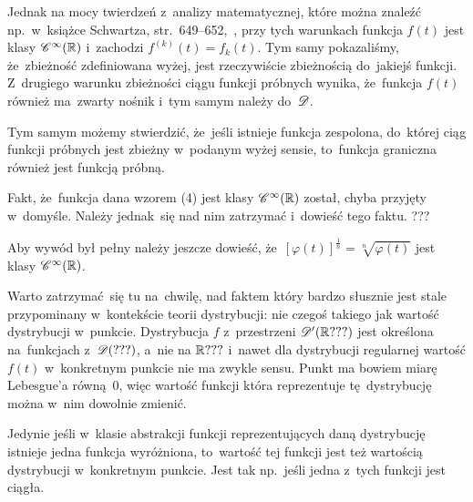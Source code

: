 \documentclass[a4paper,11pt]{article}
\numberwithin{equation}{section}
\begin{document}
Jednak na mocy twierdzeń z~analizy matematycznej, które można znaleźć
np.~w~książce Schwartza, str.~649--652,~\cite{SchwartzKursAnalizyMatematycznejVolI1979}, przy tych
warunkach funkcja $f( t )$ jest klasy $\mathcal{C}^{ \infty }( \mathbb{R} )$ i~zachodzi
$f^{ ( k ) }( t ) = f_{ k }( t )$. Tym samy pokazaliśmy, że~zbieżność
zdefiniowana wyżej, jest rzeczywiście zbieżnością do~jakiejś funkcji.
Z~drugiego warunku zbieżności ciągu funkcji próbnych wynika,
że~funkcja $f( t )$ również ma~zwarty nośnik i~tym samym należy
do~$\mathcal{D}$.

Tym samym możemy stwierdzić, że~jeśli istnieje funkcja zespolona,
do~której ciąg funkcji próbnych jest zbieżny w~podanym wyżej sensie,
to~funkcja graniczna również jest funkcją próbną.

\VerSpaceFour





\noindent
{} Fakt, że~funkcja dana wzorem (4) jest klasy
$\mathcal{C}^{ \infty }( \mathbb{R} )$ został, chyba przyjęty w~domyśle. Należy jednak~się
nad nim zatrzymać i~dowieść tego faktu. ???

\VerSpaceFour





\noindent
{} Aby wywód był pełny należy jeszcze dowieść,
że~$[ \varphi( t ) ]^{ \frac{ 1 }{ n } } = \sqrt[ n ]{ \varphi( t ) }$ jest
klasy $\mathcal{C}^{ \infty }( \mathbb{R} )$.

\VerSpaceFour





\noindent
{} Warto zatrzymać~się tu na~chwilę, nad faktem który
bardzo słusznie jest stale przypominany w~kontekście teorii
dystrybucji: nie czegoś takiego jak wartość dystrybucji w~punkcie.
Dystrybucja $f$ z~przestrzeni $\mathcal{D}'( \mathbb{R} ??? )$ jest określona
na~funkcjach z~$\mathcal{D}( ??? )$, a~nie na $\mathbb{R} ???$ i~nawet dla dystrybucji
regularnej wartość $f( t )$ w~konkretnym punkcie nie ma zwykle sensu.
Punkt ma bowiem miarę Lebesgue’a równą~0, więc wartość funkcji która
reprezentuje tę~dystrybucję można w~nim dowolnie zmienić.

Jedynie jeśli w~klasie abstrakcji funkcji reprezentujących daną
dystrybucję istnieje jedna funkcja wyróżniona, to~wartość tej funkcji
jest też wartością dystrybucji w~konkretnym punkcie. Jest tak
np.~jeśli jedna z~tych funkcji jest ciągła.

\VerSpaceFour
\end{document}
